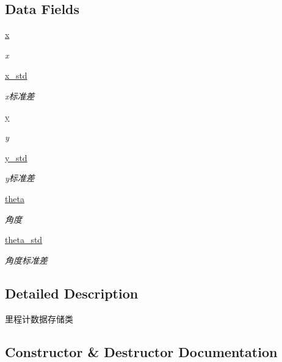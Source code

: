 \subsection*{Data Fields}
\begin{DoxyCompactItemize}
\item 
\hyperlink{classfuse___g___a_1_1_odom__unit_a0bbba6cf857ee8e2a728619c05352a31}{x}
\begin{DoxyCompactList}\small\item\em x \end{DoxyCompactList}\item 
\hyperlink{classfuse___g___a_1_1_odom__unit_abcc1831d7f1bf9403ae3640d59ad266a}{x\+\_\+std}
\begin{DoxyCompactList}\small\item\em x标准差 \end{DoxyCompactList}\item 
\hyperlink{classfuse___g___a_1_1_odom__unit_a9f5169920b2cfc396f5926cc51d7f066}{y}
\begin{DoxyCompactList}\small\item\em y \end{DoxyCompactList}\item 
\hyperlink{classfuse___g___a_1_1_odom__unit_a4893465afd2b8aadc1f2a52eddf3047d}{y\+\_\+std}
\begin{DoxyCompactList}\small\item\em y标准差 \end{DoxyCompactList}\item 
\hyperlink{classfuse___g___a_1_1_odom__unit_adbd44c24ef5387a8ba4546453d34eb8d}{theta}
\begin{DoxyCompactList}\small\item\em 角度 \end{DoxyCompactList}\item 
\hyperlink{classfuse___g___a_1_1_odom__unit_aea4c078c1566ed80c8fc16b1f53f18e4}{theta\+\_\+std}
\begin{DoxyCompactList}\small\item\em 角度标准差 \end{DoxyCompactList}\end{DoxyCompactItemize}


\subsection{Detailed Description}
里程计数据存储类 



\subsection{Constructor \& Destructor Documentation}
\mbox{\label{classfuse___g___a_1_1_odom__unit_a420542a0674acb8055e7221bbd73414e}} 
